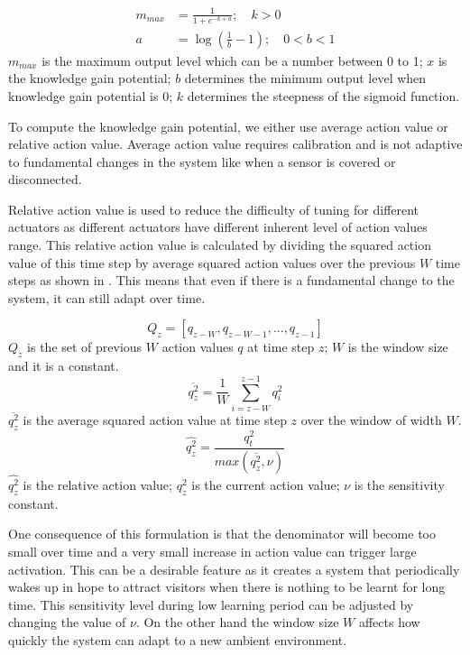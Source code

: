 \begin{subequations}\label{eqn:map_sigmoid}
	\begin{flalign} 
		m_{max} &= \frac{1}{1+e^{-k+a}}; \quad k > 0 \\
		a &= \log{(\frac{1}{b}-1)}; \quad 0 < b < 1
	\end{flalign}
\end{subequations}
$m_{max}$ is the maximum output level which can be a number between 0 to 1; $x$ is the knowledge gain potential; $b$ determines the minimum output level when knowledge gain potential is 0; $k$ determines the steepness of the sigmoid function. 

To compute the knowledge gain potential, we either use average action value or relative action value. Average action value requires calibration and is not adaptive to fundamental changes in the system like when a sensor is covered or disconnected. 

Relative action value is used to reduce the difficulty of tuning for different actuators as different actuators have different inherent level of action values range. This relative action value is calculated by dividing the squared action value of this time step by average squared action values over the previous $W$ time steps as shown in . This means that even if there is a fundamental change to the system, it can still adapt over time.  

\begin{equation}\label{eqn:action_val_set}
	Q_z = [q_{z-W}, q_{z-W-1}, ... , q_{z-1}]
\end{equation}
$Q_z$ is the set of previous $W$ action values $q$ at time step $z$; $W$ is the window size and it is a constant.
\begin{equation}\label{eqn:avg_action_val}
	\overline{q^2_z} = \frac{1}{W}\displaystyle\sum_{i=z-W}^{z-1} q_i^2
\end{equation}
$\overline{q^2_z}$ is the average squared action value at time step $z$ over the window of width $W$.
\begin{equation}\label{eqn:relative_action_val}
	\widehat{q^2_z} = \frac{q_t^2}{max(\overline{q^2_z}, \nu)}
\end{equation}
$\widehat{q^2_z}$ is the relative action value; $q_z^2$ is the current action value; $\nu$ is the sensitivity constant.

One consequence of this formulation is that the denominator will become too small over time and a very small increase in action value can trigger large activation. This can be a desirable feature as it creates a system that periodically wakes up in hope to attract visitors when there is nothing to be learnt for long time. This sensitivity level during low learning period can be adjusted by changing the value of $\nu$. On the other hand the window size $W$ affects how quickly the system can adapt to a new ambient environment. 


